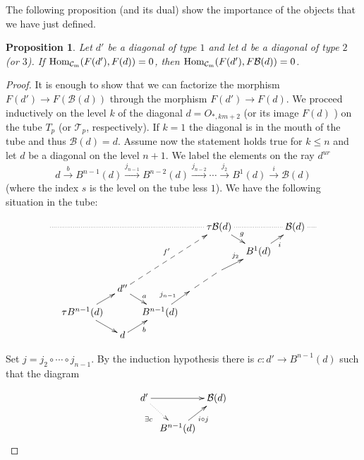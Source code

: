 \documentclass{amsart}
\theoremstyle{plain}
\newtheorem{prop}[teo]{Proposition}
\theoremstyle{definition}
\begin{document}
The following proposition (and its dual) show   the importance of the objects that we have just defined.\\

\begin{prop}\label{morfismo a  la boca del tubo}
Let $d'$ be a diagonal of type $1$ and let  $d$  be a  diagonal of
type $2$ (or $3$). If ${\mathop{\rm Hom_{\mathcal{C}_m}}\nolimits}(F(d'),F(d))=0$, then
${\mathop{\rm Hom_{\mathcal{C}_m}}\nolimits}(F(d'),F\mathcal{B}(d))=0$.

\end{prop}

\begin{proof}
It is enough to show that we can factorize the morphism
$F(d')\rightarrow F(\mathcal{B}(d))$ through the  morphism $F(d')\rightarrow F(d)$.
We proceed inductively on  the level  $k$
of the diagonal  $d=O_{*,km+2}$ (or its  image $F(d)$ ) on the tube $T_p$ (or $\mathcal{T}_p$, respectively). If
$k=1$ the diagonal is in the mouth of the tube and thus  $\mathcal{B}(d)=d$.
Assume now the statement holds true for   $k\leq n$ and let $d$ be a diagonal on the level  $n+1$. We label the elements on the ray  $d^{ur}$
$$d\stackrel{b}{\rightarrow} B^{n-1}(d)\stackrel
{j_{n-1}}{\rightarrow} B^{n-2}(d)\stackrel{j_{n-2}}{\rightarrow}
\cdots \stackrel{j_2}{\rightarrow} B^1(d)\stackrel{i}{\rightarrow}
\mathcal{B}(d)$$ (where the index  $s$ is the level on the tube less $1$). We have the following situation in the tube:

$$\xymatrix@R=.3cm@C=.3cm{ \ar@{.}[rrrrr]& & & & &\tau \mathcal{B}(d)\ar[dr]^{g} \ar@{.}[rr] & & \mathcal{B}(d) \ar@{.}[r]&\\
&&&&&& B^1(d) \ar[ur]_i & &\\
&&&&& \ar[ru]^{j_{2}}&&&\\
&& d''\ar[dr]^a \ar@{-->}[uuurrr]^{f'} && \ar@{--}[ru]&&&&\\
&\tau B^{n-1}(d)\ar[ru] \ar[dr] && B^{n-1}(d) \ar[ru]^{  j_{n-1}}&&&&&\\
&& d \ar[ru]_{b      } &&&&&& }$$

Set $j=j_2\circ \cdots \circ j_{n-1}$.
By the induction hypothesis there is   $c:d'\rightarrow B^{n-1}(d)$ such that the diagram

$$\xymatrix@R=.5cm@C=.2cm{d' \ar[rr] \ar@{.>}[dr]_{\exists c  \ \ }&& \mathcal{B}(d) \\
&B^{n-1}(d) \ar[ru]_{i\circ j}&}$$


\end{proof}
\end{document}
